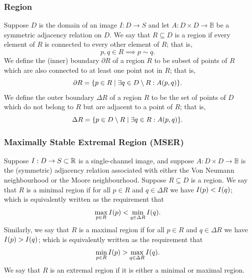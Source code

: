 \documentclass{article}
\begin{document}
\subsubsection*{Region}

Suppose $D$ is the domain of an image $I : D \to S$ and let
$A : D \times D \to \mathbb{B}$ be a symmetric adjacency relation on $D$.
We say that $R \subseteq D$ is a region if every element of $R$ is connected to
every other element of $R$; that is,
\begin{equation}
  \label{eq:def-region}
  p, q \in R
  \implies
  p \sim q
  .
\end{equation}
We define the (inner) boundary $\partial R$ of a region $R$ to be subset of
points of $R$ which are also connected to at least one point not in $R$; that
is,
\begin{equation}
  \label{eq:def-region-boundary-inner}
  \partial R
  =
  \lbrace
    p \in R
    \mid
    \exists q \in D \setminus R
    :
    A(p, q)
  \rbrace
  .
\end{equation}
We define the outer boundary $\Delta R$ of a region $R$ to be the set of points
of $D$ which do not belong to $R$ but are adjacent to a point of $R$; that is,
\begin{equation}
  \label{eq:def-region-boundary-outer}
  \Delta R
  =
  \lbrace
    p \in D \setminus R
    \mid
    \exists q \in R
    :
    A(p, q)
  \rbrace
  .
\end{equation}

\subsubsection*{Maximally Stable Extremal Region (MSER)}

Suppose $I : D \to S \subset \mathbb{R}$ is a single-channel image, and suppose
$A : D \times D \to \mathbb{B}$ is the (symmetric) adjacency relation associated
with either the Von Neumann neighbourhood or the Moore neighbourhood.
Suppose $R \subseteq D$ is a region.
We say that $R$ is a minimal region if for all $p \in R$ and $q \in \Delta R$ we
have $I(p) < I(q)$; which is equivalently written as the requirement that
\begin{equation}
  \label{eq:def-region-minimal}
  \max_{p \in R} I(p)
  <
  \min_{q \in \Delta R} I(q)
  .
\end{equation}
Similarly, we say that $R$ is a maximal region if for all $p \in R$ and
$q \in \Delta R$ we have $I(p) > I(q)$; which is equivalently written as
the requirement that
\begin{equation}
  \label{eq:def-region-minimal}
  \min_{p \in R} I(p)
  >
  \max_{q \in \Delta R} I(q)
  .
\end{equation}
We say that $R$ is an extremal region if it is either a minimal or maximal
region.
\end{document}
